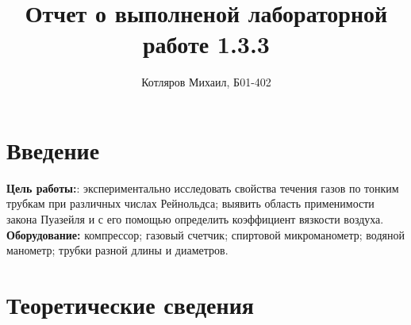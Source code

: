 \documentclass[a4paper]{article}
\title{\textbf{Отчет о выполненой лабораторной работе 1.3.3}}
\date{}
\author{Котляров Михаил, Б01-402}
\begin{document}
\maketitle
	
	\section{Введение}
	
	\textbf{Цель работы:}: экспериментально исследовать свойства течения газов по тонким трубкам при различных числах Рейнольдса; выявить область применимости закона Пуазейля и с его помощью определить коэффициент вязкости воздуха.\\

	\textbf{Оборудование:} компрессор; газовый счетчик; спиртовой микроманометр; водяной манометр; трубки разной длины и диаметров.
	
	\section{Теоретические сведения}
\end{document}
